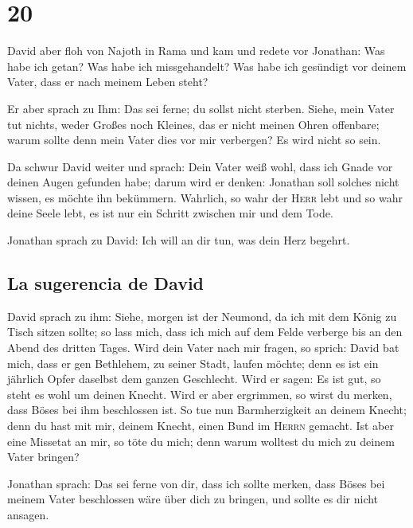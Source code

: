 \hypertarget{section-19}{%
\section{20}\label{section-19}}

 David aber floh von Najoth in Rama und kam und redete vor
Jonathan: Was habe ich getan? Was habe ich missgehandelt? Was habe ich
gesündigt vor deinem Vater, dass er nach meinem Leben steht?

 Er aber sprach zu Ihm: Das sei ferne; du sollst nicht
sterben. Siehe, mein Vater tut nichts, weder Großes noch Kleines, das er
nicht meinen Ohren offenbare; warum sollte denn mein Vater dies vor mir
verbergen? Es wird nicht so sein.

 Da schwur David weiter und sprach: Dein Vater weiß wohl,
dass ich Gnade vor deinen Augen gefunden habe; darum wird er denken:
Jonathan soll solches nicht wissen, es möchte ihn bekümmern. Wahrlich,
so wahr der \textsc{Herr} lebt und so wahr deine Seele lebt, es ist nur
ein Schritt zwischen mir und dem Tode.

 Jonathan sprach zu David: Ich will an dir tun, was dein
Herz begehrt.

\hypertarget{la-sugerencia-de-david}{%
\subsection{La sugerencia de David}\label{la-sugerencia-de-david}}

 David sprach zu ihm: Siehe, morgen ist der Neumond, da
ich mit dem König zu Tisch sitzen sollte; so lass mich, dass ich mich
auf dem Felde verberge bis an den Abend des dritten Tages.
 Wird dein Vater nach mir fragen, so sprich: David bat
mich, dass er gen Bethlehem, zu seiner Stadt, laufen möchte; denn es ist
ein jährlich Opfer daselbst dem ganzen Geschlecht.  Wird
er sagen: Es ist gut, so steht es wohl um deinen Knecht. Wird er aber
ergrimmen, so wirst du merken, dass Böses bei ihm beschlossen ist.
 So tue nun Barmherzigkeit an deinem Knecht; denn du hast
mit mir, deinem Knecht, einen Bund im \textsc{Herrn} gemacht. Ist aber
eine Missetat an mir, so töte du mich; denn warum wolltest du mich zu
deinem Vater bringen?

 Jonathan sprach: Das sei ferne von dir, dass ich sollte
merken, dass Böses bei meinem Vater beschlossen wäre über dich zu
bringen, und sollte es dir nicht ansagen.

